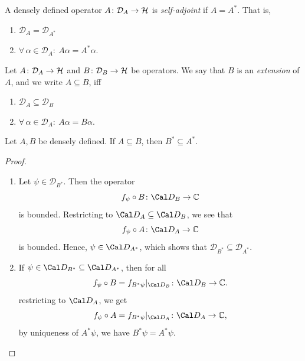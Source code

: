 \begin{definition}
  A densely defined operator $A\colon\mathcal{D}_A\to\mathcal{H}$ is
  \emph{self-adjoint} if $A=A^*$. That is,
  \begin{enumerate}[label=(\roman*)]
    \item $\mathcal{D}_A = \mathcal{D}_{A^*}$
    \item $\forall \, \alpha \in \mathcal{D}_A : \ A\alpha = A^*\alpha$.
  \end{enumerate}
\end{definition}

\begin{definition}
  Let $A\colon \mathcal{D}_A \to \mathcal{H}$ and $B\colon \mathcal{D}_B \to
  \mathcal{H}$ be operators. We say that $B$ is an
  \emph{extension} of $A$, and we write $A\subseteq
  B$, iff
  \begin{enumerate}[label=(\roman*)]
  \item $\mathcal{D}_{A}\subseteq \mathcal{D}_{B}$
  \item $\forall \, \alpha \in \mathcal{D}_{A} : \ A\alpha = B \alpha$.
  \end{enumerate}
\end{definition}

\begin{proposition}
  \label{prp:adjointreverse}
  Let $A,B$ be densely defined. If $A\subseteq B$, then $B^*\subseteq
  A^*$.
\end{proposition}

\begin{proof}
  \begin{enumerate}[label=(\roman*)]
  \item Let $\psi \in \mathcal{D}_{B^*}$.
  Then the operator
  \begin{equation}
    f_\psi\circ B\colon \Cal D_B\to\C
  \end{equation}
  is bounded.
  Restricting to \(\Cal D_A\subseteq\Cal D_B\), we see that
  \begin{equation}
    f_\psi\circ A\colon \Cal D_A\to\C
  \end{equation}
  is bounded. Hence, \(\psi\in\Cal D_{A^*}\),
  which shows that $\mathcal{D}_{B^*}\subseteq \mathcal{D}_{A^*}$.
  \item
  If \(\psi\in\Cal D_{B^*}\subseteq\Cal D_{A^*}\), then for all
  \begin{equation}
    f_\psi\circ B = f_{B^*\psi}|_{\Cal D_B} \colon\Cal D_B\to\C.
  \end{equation}
  restricting to \(\Cal D_A\), we get
  \begin{equation}
    f_\psi\circ A = f_{B^*\psi}|_{\Cal D_A} \colon\Cal D_A\to\C,
  \end{equation}
  by uniqueness of \(A^*\psi\), we have $B^*\psi = A^*\psi$.
  \end{enumerate}
\end{proof}

